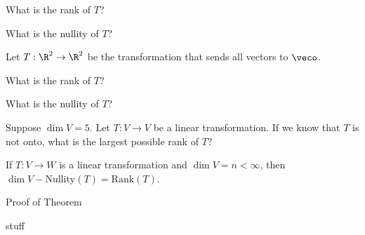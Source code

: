 What is the rank of $T$?  



What is the nullity of $T$?  



\edXsolution{
}

\endedxproblem





Let $T: \R^2 \rightarrow \R^2$ be the transformation that sends all vectors to $\veco$.  


What is the rank of $T$?  



What is the nullity of $T$?  



\edXsolution{
}

\endedxproblem





Suppose $\dim V = 5$.  Let $T: V\rightarrow V$ be a linear transformation.  If we know that $T$ is
not onto, what is the largest possible rank of $T$?  



\edXsolution{
}

\endedxproblem


\endedxvertical






{}  If $T:V\rightarrow W$ is a linear transformation and $\dim V = n < \infty$, then $\dim V - \mathrm{Nullity}(T) = \mathrm{Rank}(T)$.  




\begin{edXshowhide}{Proof of Theorem}

stuff

\end{edXshowhide}



\endedxtext


\endedxvertical



